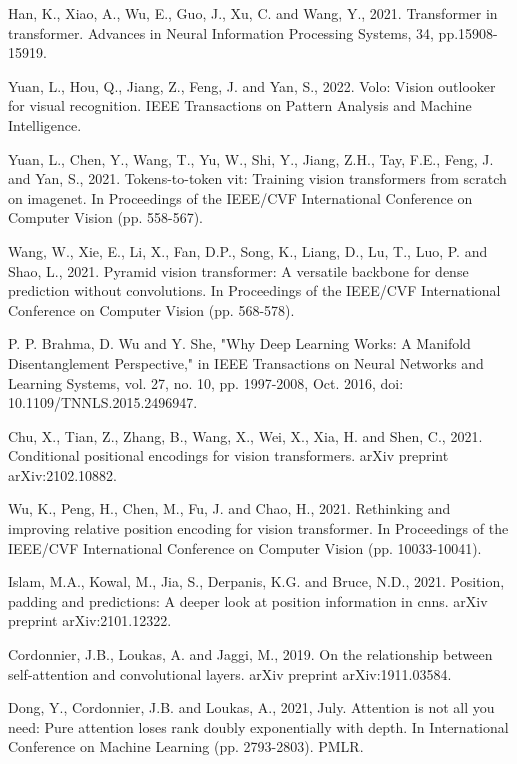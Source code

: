 \begin{thebibliography}{ widest-label }
	Han, K., Xiao, A., Wu, E., Guo, J., Xu, C. and Wang, Y., 2021. Transformer in transformer. Advances in Neural Information Processing Systems, 34, pp.15908-15919.
	
	Yuan, L., Hou, Q., Jiang, Z., Feng, J. and Yan, S., 2022. Volo: Vision outlooker for visual recognition. IEEE Transactions on Pattern Analysis and Machine Intelligence.
	
	Yuan, L., Chen, Y., Wang, T., Yu, W., Shi, Y., Jiang, Z.H., Tay, F.E., Feng, J. and Yan, S., 2021. Tokens-to-token vit: Training vision transformers from scratch on imagenet. In Proceedings of the IEEE/CVF International Conference on Computer Vision (pp. 558-567).
	
	Wang, W., Xie, E., Li, X., Fan, D.P., Song, K., Liang, D., Lu, T., Luo, P. and Shao, L., 2021. Pyramid vision transformer: A versatile backbone for dense prediction without convolutions. In Proceedings of the IEEE/CVF International Conference on Computer Vision (pp. 568-578).
	
	P. P. Brahma, D. Wu and Y. She, "Why Deep Learning Works: A Manifold Disentanglement Perspective," in IEEE Transactions on Neural Networks and Learning Systems, vol. 27, no. 10, pp. 1997-2008, Oct. 2016, doi: 10.1109/TNNLS.2015.2496947.
	
	Chu, X., Tian, Z., Zhang, B., Wang, X., Wei, X., Xia, H. and Shen, C., 2021. Conditional positional encodings for vision transformers. arXiv preprint arXiv:2102.10882.
	
	Wu, K., Peng, H., Chen, M., Fu, J. and Chao, H., 2021. Rethinking and improving relative position encoding for vision transformer. In Proceedings of the IEEE/CVF International Conference on Computer Vision (pp. 10033-10041).
	
	Islam, M.A., Kowal, M., Jia, S., Derpanis, K.G. and Bruce, N.D., 2021. Position, padding and predictions: A deeper look at position information in cnns. arXiv preprint arXiv:2101.12322.
	
	Cordonnier, J.B., Loukas, A. and Jaggi, M., 2019. On the relationship between self-attention and convolutional layers. arXiv preprint arXiv:1911.03584.
	
	Dong, Y., Cordonnier, J.B. and Loukas, A., 2021, July. Attention is not all you need: Pure attention loses rank doubly exponentially with depth. In International Conference on Machine Learning (pp. 2793-2803). PMLR.
	

\end{thebibliography}
